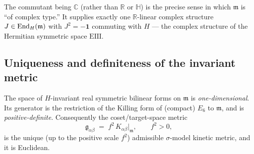 The commutant being $\mathbb C$ (rather than $\mathbb R$ or
$\mathbb H$) is the precise sense in which $\mathfrak m$ is ``of complex
type.'' It supplies exactly one $\mathbb R$-linear complex structure
$J\in\operatorname{End}_H(\mathfrak m)$ with $J^2=-\mathbf 1$ commuting with $H$ --- the
complex structure of the Hermitian symmetric space $\mathrm{EIII}$.

\subsection{Uniqueness and definiteness of the invariant metric}
\label{sec:app-spectrum:metric}

\begin{theorem}
\label{thm:app-spectrum:metric}
The space of $H$-invariant real symmetric bilinear forms on
$\mathfrak m$ is \emph{one-dimensional}. Its generator is the restriction
of the Killing form of (compact) $E_6$ to $\mathfrak m$, and is
\emph{positive-definite}. Consequently the coset/target-space metric
\begin{equation}
  \mathfrak g_{\alpha\beta} \;=\; f^2\,K_{\alpha\beta}\big|_{\mathfrak m},
  \qquad f^2>0,
  \label{eq:app-spectrum:metric}
\end{equation}
is the unique (up to the positive scale $f^2$) admissible
$\sigma$-model kinetic metric, and it is Euclidean.
\end{theorem}

